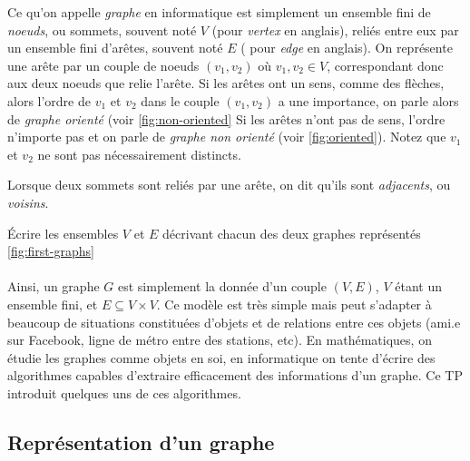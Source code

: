 Ce qu'on appelle \textit{graphe} en informatique est simplement un ensemble fini de \textit{noeuds}, ou sommets, souvent noté $ V $ (pour \textit{vertex} en anglais), reliés entre eux par un ensemble fini d'arêtes, souvent noté $ E $ ( pour \textit{edge} en anglais). On représente une arête par un couple de noeuds $ (v_1, v_2) $ où $ v_1, v_2 \in V $, correspondant donc aux deux noeuds que relie l'arête. Si les arêtes ont un sens, comme des flèches, alors l'ordre de $ v_1 $ et $ v_2 $ dans le couple $ (v_1, v_2)  $ a une importance, on parle alors de \textit{graphe orienté} (voir \autoref{fig:non-oriented} Si les arêtes n'ont pas de sens, l'ordre n'importe pas et on parle de \textit{graphe non orienté} (voir \autoref{fig:oriented}). Notez que $ v_1 $ et $ v_2 $ ne sont pas nécessairement distincts.

Lorsque deux sommets sont reliés par une arête, on dit qu'ils sont \textit{adjacents}, ou \textit{voisins}.

\ques Écrire les ensembles $ V $ et $ E $ décrivant chacun des deux graphes représentés \autoref{fig:first-graphs}

\paragraph{} Ainsi, un graphe $ G $ est simplement la donnée d'un couple $ (V, E) $, $ V $ étant un ensemble fini, et $ E \subseteq V \times V $. Ce modèle est très simple mais peut s'adapter à beaucoup de situations constituées d'objets et de relations entre ces objets (ami.e sur Facebook, ligne de métro entre des stations, etc). En mathématiques, on étudie les graphes comme objets en soi, en informatique on tente d'écrire des algorithmes capables d'extraire efficacement des informations d'un graphe. Ce TP introduit quelques uns de ces algorithmes.

\subsection*{Représentation d'un graphe}

